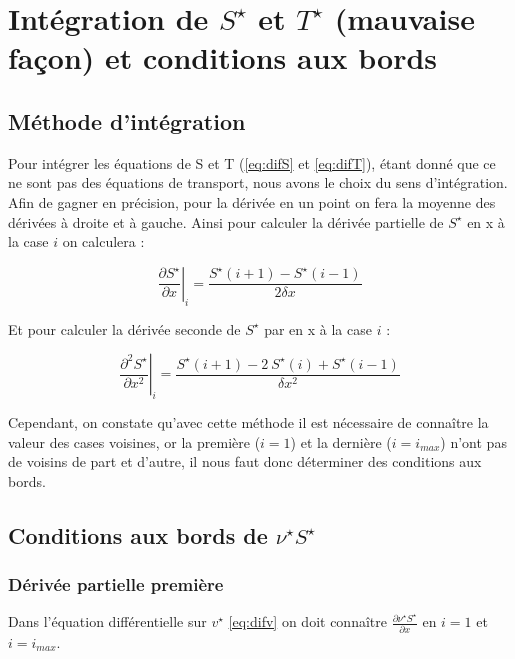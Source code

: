 \section{Intégration de $S^{\star}$ et $T^{\star}$ (mauvaise façon) et conditions aux bords}

\subsection{Méthode d'intégration}

Pour intégrer les équations de S et T (\eqref{eq:difS} et \eqref{eq:difT}), étant donné que ce ne sont pas des équations de transport, nous avons le choix du sens d'intégration. Afin de gagner en précision, pour la dérivée en un point on fera la moyenne des dérivées à droite et à gauche. Ainsi pour calculer la dérivée partielle de $S^{\star}$ en x à la case $i$ on calculera :

\begin{equation}
  \left. \frac{\partial S^{\star}}{\partial x} \right|_i = \frac{S^{\star}(i+1)-S^{\star}(i-1)}{2\delta x} \label{eq:dif_ordre1}
\end{equation}

Et pour calculer la dérivée seconde de $S^{\star}$ par en x à la case $i$ :

\begin{equation}
  \left. \frac{\partial^2 S^{\star}}{\partial x^2}\right|_i=\frac{S^{\star}(i+1)-2\ S^{\star}(i) +S^{\star}(i-1)}{\delta x^2} \label{eq:dif_ordre2}
\end{equation}

Cependant, on constate qu'avec cette méthode il est nécessaire de connaître la valeur des cases voisines, or la première ($i=1$) et la dernière ($i=i_{max}$) n'ont pas de voisins de part et d'autre, il nous faut donc déterminer des conditions aux bords.


\subsection{Conditions aux bords de $\nu^{\star}S^{\star}$}

\subsubsection{Dérivée partielle première}

Dans l'équation différentielle sur $v^{\star}$ \eqref{eq:difv} on doit connaître $\frac{\partial \nu^{\star} S^{\star}}{\partial x}$ en $i=1$ et $i=i_{max}$.

